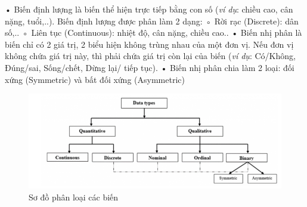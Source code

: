 \documentclass{report}
\newcommand\tab[1][1.25cm]{\hspace*{#1}}
\begin{document}
            \vspace{0.2cm}\newline\tab[1.5cm]• Biến định lượng là biến thể hiện trực tiếp bằng con số (\textit{ví dụ}: chiều cao, cân nặng, tuổi,..). Biến định lượng được phân làm 2 dạng: 
            \vspace{0.2cm}\newline\tab[2.5cm]◦ Rời rạc (Discrete): dân số,..
            \vspace{0.2cm}\newline\tab[2.5cm]◦ Liên tục (Continuous): nhiệt độ, cân nặng, chiều cao..
            \vspace{0.2cm}\newline\tab[1.5cm]• Biến nhị phân là biến chỉ có 2 giá trị, 2 biểu hiện không trùng nhau của một đơn vị. Nếu đơn vị không chứa giá trị này, thì phải chứa giá trị còn lại của biến (\textit{ví dụ}: Có/Không, Đúng/sai, Sống/chết, Dừng lại/ tiếp tục).
            \vspace{0.2cm}\newline\tab[1.5cm]• Biến nhị phân chia làm 2 loại: đối xứng (Symmetric) và bất đối xứng (Asymmetric)
            
        \begin{center}
            \begin{figure}[htp]
                \begin{center}
                    \includegraphics[scale = 0.75]{image/sodophanloaibien.png}
                \end{center}
                \caption{Sơ đồ phân loại các biến}
            \end{figure}
        \end{center}
        
\end{document}
